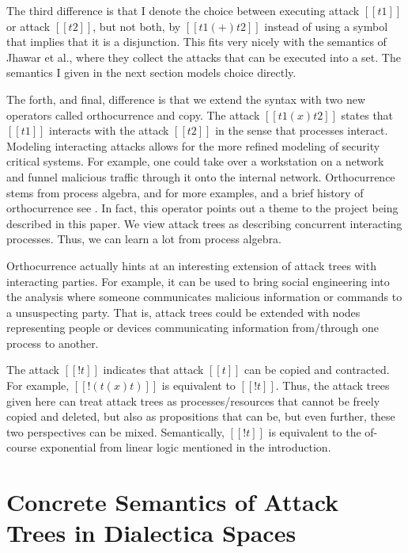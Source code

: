 \documentclass{llncs}
\begin{document}
The third difference is that I denote the choice between executing
attack $[[t1]]$ or attack $[[t2]]$, but not both, by $[[t1 (+) t2]]$
instead of using a symbol that implies that it is a disjunction.  This
fits very nicely with the semantics of Jhawar et al., where they
collect the attacks that can be executed into a set.  The semantics I
given in the next section models choice directly.

The forth, and final, difference is that we extend the syntax with two
new operators called orthocurrence and copy.  The attack $[[t1 (x)
    t2]]$ states that $[[t1]]$ interacts with the attack $[[t2]]$ in
the sense that processes interact.  Modeling interacting attacks
allows for the more refined modeling of security critical systems.
For example, one could take over a workstation on a network and funnel
malicious traffic through it onto the internal network.  Orthocurrence
stems from process algebra, and for more examples, and a brief history
of orthocurrence see \cite{Pratt:2001}.  In fact, this operator points
out a theme to the project being described in this paper.  We view
attack trees as describing concurrent interacting processes.  Thus, we
can learn a lot from process algebra.

Orthocurrence actually hints at an interesting extension of attack
trees with interacting parties.  For example, it can be used to bring
social engineering into the analysis where someone communicates
malicious information or commands to a unsuspecting party.  That is,
attack trees could be extended with nodes representing people or
devices communicating information from/through one process to another.

The attack $[[! t]]$ indicates that attack $[[t]]$ can be copied and
contracted.  For example, $[[! (t (x) t)]]$ is equivalent to $[[!
    t]]$.  Thus, the attack trees given here can treat attack trees as
processes/resources that cannot be freely copied and deleted, but also
as propositions that can be, but even further, these two perspectives
can be mixed.  Semantically, $[[! t]]$ is equivalent to the of-course
exponential from linear logic mentioned in the introduction.

\section{Concrete Semantics of Attack Trees in Dialectica Spaces}
\label{sec:concrete_semantics_of_attack_trees_in_dialectica_spaces}
\end{document}
